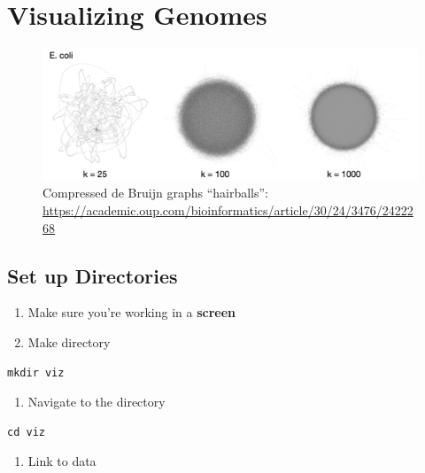 \documentclass[
]{book}
\providecommand{\tightlist}{%
  \setlength{\itemsep}{0pt}\setlength{\parskip}{0pt}}
\begin{document}
\hypertarget{visualizing-genomes}{%
\chapter{Visualizing Genomes}\label{visualizing-genomes}}

\begin{figure}
\centering
\includegraphics[width=1\textwidth,height=\textheight]{./Figures/hairballsB.png}
\caption{Compressed de Bruijn graphs ``hairballs'': \url{https://academic.oup.com/bioinformatics/article/30/24/3476/2422268}}
\end{figure}

\hypertarget{set-up-directories}{%
\section{Set up Directories}\label{set-up-directories}}

\begin{enumerate}
\def\labelenumi{\arabic{enumi}.}
\item
  Make sure you're working in a \textbf{screen}
\item
  Make directory
\end{enumerate}

\begin{verbatim}
mkdir viz
\end{verbatim}

\begin{enumerate}
\def\labelenumi{\arabic{enumi}.}
\setcounter{enumi}{2}
\tightlist
\item
  Navigate to the directory
\end{enumerate}

\begin{verbatim}
cd viz
\end{verbatim}

\begin{enumerate}
\def\labelenumi{\arabic{enumi}.}
\setcounter{enumi}{3}
\tightlist
\item
  Link to data
\end{enumerate}
\end{document}
